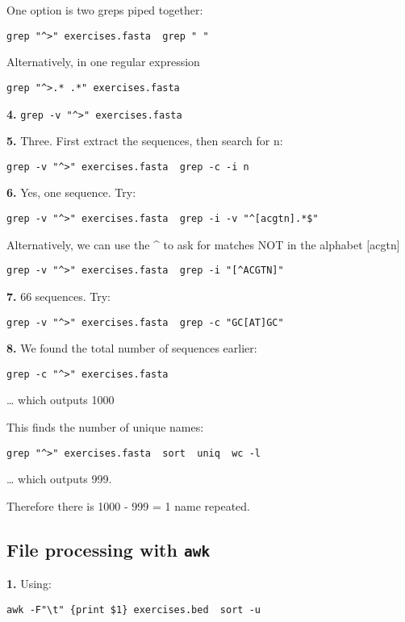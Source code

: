 \documentclass[11pt]{article}
\begin{document}
One option is two greps piped together:

\texttt{grep\ "\^{}\textgreater{}"\ exercises.fasta\ \textbar{}\ grep\ "\ "}

Alternatively, in one regular expression

\texttt{grep\ "\^{}\textgreater{}.*\ .*"\ exercises.fasta}

\textbf{4.} \texttt{grep\ -v\ "\^{}\textgreater{}"\ exercises.fasta}

\textbf{5.} Three. First extract the sequences, then search for n:

\texttt{grep\ -v\ "\^{}\textgreater{}"\ exercises.fasta\ \textbar{}\ grep\ -c\ -i\ n}

\textbf{6.} Yes, one sequence. Try:

\texttt{grep\ -v\ "\^{}\textgreater{}"\ exercises.fasta\ \textbar{}\ grep\ -i\ -v\ "\^{}{[}acgtn{]}.*\$"}

Alternatively, we can use the \^{} to ask for matches NOT in the
alphabet {[}acgtn{]}

\texttt{grep\ -v\ "\^{}\textgreater{}"\ exercises.fasta\ \textbar{}\ grep\ -i\ "{[}\^{}ACGTN{]}"}

\textbf{7.} 66 sequences. Try:

\texttt{grep\ -v\ "\^{}\textgreater{}"\ exercises.fasta\ \textbar{}\ grep\ -c\ "GC{[}AT{]}GC"}

\textbf{8.} We found the total number of sequences earlier:

\texttt{grep\ -c\ "\^{}\textgreater{}"\ exercises.fasta}

\ldots{} which outputs 1000

This finds the number of unique names:

\texttt{grep\ "\^{}\textgreater{}"\ exercises.fasta\ \textbar{}\ sort\ \textbar{}\ uniq\ \textbar{}\ wc\ -l}

\ldots{} which outputs 999.

Therefore there is 1000 - 999 = 1 name repeated.

    \hypertarget{file-processing-with-awk}{%
\subsection{\texorpdfstring{File processing with
\texttt{awk}}{File processing with awk}}\label{file-processing-with-awk}}

\textbf{1.} Using:

\texttt{awk\ -F"\textbackslash{}t"\ \textquotesingle{}\{print\ \$1\}\textquotesingle{}\ exercises.bed\ \textbar{}\ sort\ -u}
\end{document}
